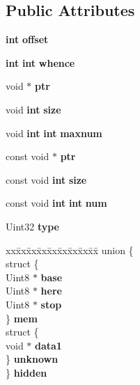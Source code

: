 \subsection*{Public Attributes}
\begin{DoxyCompactItemize}
\item 
{\bf int} {\bfseries offset}\label{struct_s_d_l___r_wops_a71fb283863acfd186d664f4f2a7eb7d0}

\item 
{\bf int} {\bf int} {\bfseries whence}\label{struct_s_d_l___r_wops_a93eb5bc3cb33e22cc6c4e6362dcbe625}

\item 
void $\ast$ {\bfseries ptr}\label{struct_s_d_l___r_wops_a3f68b93789331775de802d51a2934f0a}

\item 
void {\bf int} {\bfseries size}\label{struct_s_d_l___r_wops_ae0bd64203ee30429f8b879cbd543d694}

\item 
void {\bf int} {\bf int} {\bfseries maxnum}\label{struct_s_d_l___r_wops_a60f37bebd3385e0fba9164a45c064e01}

\item 
const void $\ast$ {\bfseries ptr}\label{struct_s_d_l___r_wops_a51baff579726790887a4ca41ce14873c}

\item 
const void {\bf int} {\bfseries size}\label{struct_s_d_l___r_wops_a6c82c345afd893513c15b268f5bb4595}

\item 
const void {\bf int} {\bf int} {\bfseries num}\label{struct_s_d_l___r_wops_afb1b7d6d83dcf6b1d4fdd2b4041577e2}

\item 
Uint32 {\bfseries type}\label{struct_s_d_l___r_wops_a099017bfceaac24ced0e4d08a4e0a023}

\item 
\begin{tabbing}
xx\=xx\=xx\=xx\=xx\=xx\=xx\=xx\=xx\=\kill
union \{\\
\>struct \{\\
\>\>Uint8 $\ast$ {\bfseries base}\\
\>\>Uint8 $\ast$ {\bfseries here}\\
\>\>Uint8 $\ast$ {\bfseries stop}\\
\>\} {\bfseries mem}\\
\>struct \{\\
\>\>void $\ast$ {\bfseries data1}\\
\>\} {\bfseries unknown}\\
\} {\bfseries hidden}\label{struct_s_d_l___r_wops_a8ac2a4e01366f7bb9f41956beffa759d}
\\

\end{tabbing}\end{DoxyCompactItemize}


